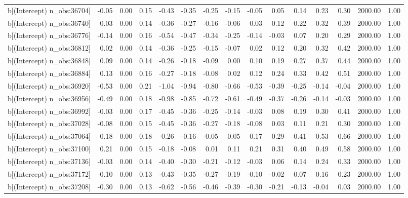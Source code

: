 \begin{table}[ht]
\begin{tabular}{rrrrrrrrrrrrrrr}
  b[(Intercept) n\_obs:36704] & -0.05 & 0.00 & 0.15 & -0.43 & -0.35 & -0.25 & -0.15 & -0.05 & 0.05 & 0.14 & 0.23 & 0.30 & 2000.00 & 1.00 \\ 
  b[(Intercept) n\_obs:36740] & 0.03 & 0.00 & 0.14 & -0.36 & -0.27 & -0.16 & -0.06 & 0.03 & 0.12 & 0.22 & 0.32 & 0.39 & 2000.00 & 1.00 \\ 
  b[(Intercept) n\_obs:36776] & -0.14 & 0.00 & 0.16 & -0.54 & -0.47 & -0.34 & -0.25 & -0.14 & -0.03 & 0.07 & 0.20 & 0.29 & 2000.00 & 1.00 \\ 
  b[(Intercept) n\_obs:36812] & 0.02 & 0.00 & 0.14 & -0.36 & -0.25 & -0.15 & -0.07 & 0.02 & 0.12 & 0.20 & 0.32 & 0.42 & 2000.00 & 1.00 \\ 
  b[(Intercept) n\_obs:36848] & 0.09 & 0.00 & 0.14 & -0.26 & -0.18 & -0.09 & 0.00 & 0.10 & 0.19 & 0.27 & 0.37 & 0.44 & 2000.00 & 1.00 \\ 
  b[(Intercept) n\_obs:36884] & 0.13 & 0.00 & 0.16 & -0.27 & -0.18 & -0.08 & 0.02 & 0.12 & 0.24 & 0.33 & 0.42 & 0.51 & 2000.00 & 1.00 \\ 
  b[(Intercept) n\_obs:36920] & -0.53 & 0.00 & 0.21 & -1.04 & -0.94 & -0.80 & -0.66 & -0.53 & -0.39 & -0.25 & -0.14 & -0.04 & 2000.00 & 1.00 \\ 
  b[(Intercept) n\_obs:36956] & -0.49 & 0.00 & 0.18 & -0.98 & -0.85 & -0.72 & -0.61 & -0.49 & -0.37 & -0.26 & -0.14 & -0.03 & 2000.00 & 1.00 \\ 
  b[(Intercept) n\_obs:36992] & -0.03 & 0.00 & 0.17 & -0.45 & -0.36 & -0.25 & -0.14 & -0.03 & 0.08 & 0.19 & 0.30 & 0.41 & 2000.00 & 1.00 \\ 
  b[(Intercept) n\_obs:37028] & -0.08 & 0.00 & 0.15 & -0.45 & -0.36 & -0.27 & -0.18 & -0.08 & 0.03 & 0.11 & 0.21 & 0.30 & 2000.00 & 1.00 \\ 
  b[(Intercept) n\_obs:37064] & 0.18 & 0.00 & 0.18 & -0.26 & -0.16 & -0.05 & 0.05 & 0.17 & 0.29 & 0.41 & 0.53 & 0.66 & 2000.00 & 1.00 \\ 
  b[(Intercept) n\_obs:37100] & 0.21 & 0.00 & 0.15 & -0.18 & -0.08 & 0.01 & 0.11 & 0.21 & 0.31 & 0.40 & 0.49 & 0.58 & 2000.00 & 1.00 \\ 
  b[(Intercept) n\_obs:37136] & -0.03 & 0.00 & 0.14 & -0.40 & -0.30 & -0.21 & -0.12 & -0.03 & 0.06 & 0.14 & 0.24 & 0.33 & 2000.00 & 1.00 \\ 
  b[(Intercept) n\_obs:37172] & -0.10 & 0.00 & 0.13 & -0.43 & -0.35 & -0.27 & -0.19 & -0.10 & -0.02 & 0.07 & 0.16 & 0.23 & 2000.00 & 1.00 \\ 
  b[(Intercept) n\_obs:37208] & -0.30 & 0.00 & 0.13 & -0.62 & -0.56 & -0.46 & -0.39 & -0.30 & -0.21 & -0.13 & -0.04 & 0.03 & 2000.00 & 1.00 \\ 

\end{tabular}
\end{table}
